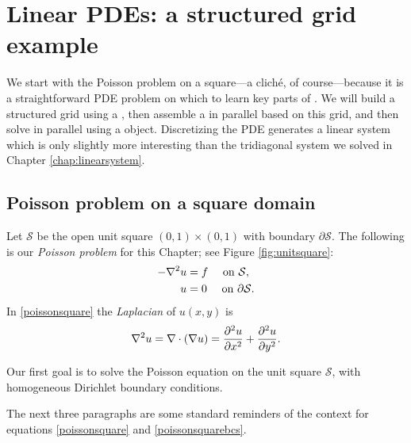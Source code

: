
\chapter{Linear PDEs: a structured grid example}
\label{chap:structured}

We start with the Poisson problem on a square---a clich\'e, of course---because it is a straightforward PDE problem on which to learn key parts of \PETSc.  We will build a structured grid using a \pDMDA, then assemble a \pMat in parallel based on this grid, and then solve in parallel using a \pKSP object.  Discretizing the PDE generates a linear system which is only slightly more interesting than the tridiagonal system we solved in Chapter \ref{chap:linearsystem}.

\section{Poisson problem on a square domain}

Let $\mathcal{S}$ be the open unit square $(0,1)\times(0,1)$ with boundary $\partial\mathcal{S}$.  The following is our \emph{Poisson problem} for this Chapter;  see Figure \ref{fig:unitsquare}:
\begin{align}
- \nabla^2 u &= f \quad \text{ on } \mathcal{S}, \label{poissonsquare} \\
u &= 0 \quad \text{ on } \partial \mathcal{S}. \label{poissonsquarebcs}
\end{align}
In \eqref{poissonsquare} the \emph{Laplacian} of $u(x,y)$ is
    $$\nabla^2 u = \nabla\cdot(\nabla u) = \frac{\partial^2 u}{\partial x^2} + \frac{\partial^2 u}{\partial y^2}.$$

\begin{marginfigure}
\caption{Our first goal is to solve the Poisson equation on the unit square $\mathcal{S}$, with homogeneous Dirichlet boundary conditions.}
\label{fig:unitsquare}
\end{marginfigure}

The next three paragraphs are some standard reminders of the context for equations \eqref{poissonsquare} and \eqref{poissonsquarebcs}.

